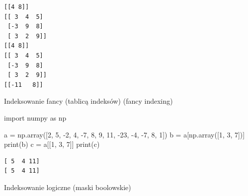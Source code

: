 \documentclass[
  polish,
  letterpaper,
  DIV=11,
  numbers=noendperiod]{scrreprt}
\newenvironment{Shaded}{\begin{snugshade}}{\end{snugshade}}
\newcommand{\BuiltInTok}[1]{\textcolor[rgb]{0.00,0.23,0.31}{#1}}
\newcommand{\DecValTok}[1]{\textcolor[rgb]{0.68,0.00,0.00}{#1}}
\newcommand{\ImportTok}[1]{\textcolor[rgb]{0.00,0.46,0.62}{#1}}
\newcommand{\NormalTok}[1]{\textcolor[rgb]{0.00,0.23,0.31}{#1}}
\newcommand{\OperatorTok}[1]{\textcolor[rgb]{0.37,0.37,0.37}{#1}}
\begin{document}
\begin{verbatim}
[[4 8]]
[[ 3  4  5]
 [-3  9  8]
 [ 3  2  9]]
[[4 8]]
[[ 3  4  5]
 [-3  9  8]
 [ 3  2  9]]
[[-11   8]]
\end{verbatim}

Indeksowanie fancy (tablicą indeksów) (fancy indexing)

\begin{Shaded}
\begin{Highlighting}[]
\ImportTok{import}\NormalTok{ numpy }\ImportTok{as}\NormalTok{ np}

\NormalTok{a }\OperatorTok{=}\NormalTok{ np.array([}\DecValTok{2}\NormalTok{, }\DecValTok{5}\NormalTok{, }\OperatorTok{{-}}\DecValTok{2}\NormalTok{, }\DecValTok{4}\NormalTok{, }\OperatorTok{{-}}\DecValTok{7}\NormalTok{, }\DecValTok{8}\NormalTok{, }\DecValTok{9}\NormalTok{, }\DecValTok{11}\NormalTok{, }\OperatorTok{{-}}\DecValTok{23}\NormalTok{, }\OperatorTok{{-}}\DecValTok{4}\NormalTok{, }\OperatorTok{{-}}\DecValTok{7}\NormalTok{, }\DecValTok{8}\NormalTok{, }\DecValTok{1}\NormalTok{])}
\NormalTok{b }\OperatorTok{=}\NormalTok{ a[np.array([}\DecValTok{1}\NormalTok{, }\DecValTok{3}\NormalTok{, }\DecValTok{7}\NormalTok{])]}
\BuiltInTok{print}\NormalTok{(b)}
\NormalTok{c }\OperatorTok{=}\NormalTok{ a[[}\DecValTok{1}\NormalTok{, }\DecValTok{3}\NormalTok{, }\DecValTok{7}\NormalTok{]]}
\BuiltInTok{print}\NormalTok{(c)}
\end{Highlighting}
\end{Shaded}

\begin{verbatim}
[ 5  4 11]
[ 5  4 11]
\end{verbatim}

Indeksowanie logiczne (maski boolowskie)
\end{document}
